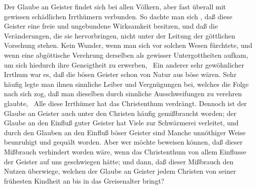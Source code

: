 Der Glaube an Geister findet sich bei allen Völkern, aber fast überall mit gewissen schädlichen Irrthümern verbunden. So dachte man sich \zB , daß diese Geister eine freie und ungebundene Wirksamkeit besitzen, und daß die Veränderungen, die sie hervorbringen, nicht unter der Leitung der göttlichen Vorsehung stehen. Kein Wunder, wenn man sich vor solchen Wesen fürchtete, und wenn eine abgöttische Verehrung derselben als gewisser Untergottheiten aufkam, um sich hiedurch ihre Geneigtheit zu erwerben, \udgl\  Ein anderer sehr gewöhnlicher Irrthum war es, daß die bösen Geister schon von Natur aus böse wären. Sehr häufig legte man ihnen sinnliche Leiber und Vergnügungen bei, welches die Folge nach sich zog, daß man dieselben durch sinnliche Ausschweifungen zu verehren glaubte, \usw\ Alle diese Irrthümer hat das Christenthum verdrängt. Dennoch ist der Glaube an Geister auch unter den Christen häufig gemißbraucht worden; der Glaube an den Einfluß guter Geister hat Viele zur Schwärmerei verleitet, und durch den Glauben an den Einfluß böser Geister sind Manche unnöthiger Weise beunruhigt und gequält worden. Aber wer möchte beweisen können, daß dieser Mißbrauch verhindert worden wäre, wenn das Christenthum von allem Einflusse der Geister auf uns geschwiegen hätte; und dann, daß dieser Mißbrauch den Nutzen überwiege, welchen der Glaube an Geister jedem Christen von seiner frühesten Kindheit an bis in das Greisenalter bringt?~

\endinput
